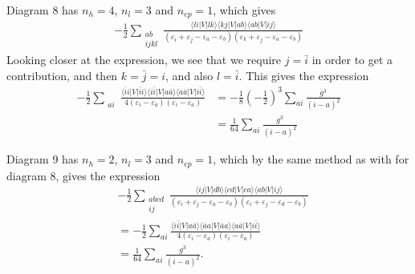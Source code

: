 Diagram 8 has $n_h = 4$, $n_l = 3$ and $n_{ep} = 1$, which gives
\begin{align*}
    -\frac{1}{2} \sum_{\substack{ab \\ ijkl}} \frac{
        \langle li \vert V \vert lk \rangle
        \langle kj \vert V \vert ab \rangle
        \langle ab \vert V \vert ij \rangle
    }{
        (
            \varepsilon_i + \varepsilon_j - \varepsilon_a - \varepsilon_b
        )(
            \varepsilon_k + \varepsilon_j - \varepsilon_a - \varepsilon_b
        )
    }
\end{align*}
Looking closer at the expression, we see that we require $j = \bar{i}$ in order to get a contribution, and then $k = \bar{j} = i$, and also $l = \bar{i}$. %
This gives the expression
\begin{align*}
    -\frac{1}{2} \sum_{\substack{ai}} \frac{
        \langle \bar{i} i \vert V \vert \bar{i} i \rangle %
        \langle i \bar{i} \vert V \vert a \bar{a} \rangle %
        \langle a \bar{a} \vert V \vert i \bar{i} \rangle %
    }{
        4(
            \varepsilon_i - \varepsilon_a
        )(
            \varepsilon_i - \varepsilon_a
        )
    } &= -\frac{1}{8} \left( -\frac{1}{2} \right)^3 \sum_{ai} \frac{
        g^3
    }{(i - a)^2} \\
    &= \frac{1}{64} \sum_{ai} \frac{
        g^3
    }{(i - a)^2}
\end{align*}

Diagram 9 has $n_h = 2$, $n_l = 3$ and $n_{ep} = 1$, which by the same method as with for diagram 8, gives the expression
\begin{align*}
    & -\frac{1}{2} \sum_{\substack{abcd \\ ij}} \frac{
        \langle ij \vert V \vert db \rangle
        \langle cd \vert V \vert ca \rangle
        \langle ab \vert V \vert ij \rangle
    }{
        (
            \varepsilon_i + \varepsilon_j - \varepsilon_a - \varepsilon_b
        )(
            \varepsilon_i + \varepsilon_j - \varepsilon_d - \varepsilon_b
        )
    } \\
    &= -\frac{1}{2} \sum_{ai} \frac{
        \langle i\bar{i} \vert V \vert a\bar{a} \rangle %
        \langle \bar{a}a \vert V \vert \bar{a}a \rangle
        \langle a\bar{a} \vert V \vert i\bar{i} \rangle %
    }{
        4(
            \varepsilon_i - \varepsilon_a
        )(
            \varepsilon_i - \varepsilon_a
        )
    } \\
    &= \frac{1}{64} \sum_{ai} \frac{g^3}{(i - a)^2}.
\end{align*}

